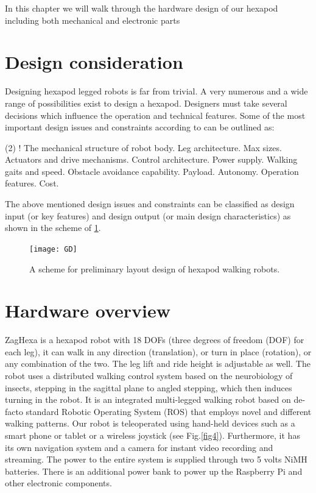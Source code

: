 In this chapter we will walk through the hardware design of our hexapod including both mechanical and electronic parts

\section{Design consideration}
Designing hexapod legged robots is far from trivial. A very numerous and a wide range of possibilities exist to design a hexapod. Designers must take several decisions which influence the operation and technical features. Some of the most important design issues and constraints according to \cite{48h} can be outlined as:

\begin{tasks}[style=itemize,after-item-skip = {-1ex}](2)
	\task! The mechanical structure of robot body.
	\task Leg architecture.
	\task Max sizes.
	\task Actuators and drive mechanisms.
	\task Control architecture.
	\task Power supply.
	\task Walking gaits and speed.
	\task Obstacle avoidance capability.
	\task Payload.
	\task Autonomy.
	\task Operation features.
	\task Cost.
\end{tasks}

The above mentioned design issues and constraints can be classified as design input (or key	features) and design output (or main design characteristics) as shown in the scheme of \ref{GD}.

\begin{figure}[H]		
	\centering
	\texttt{[image: GD]}
    \caption{ A scheme for preliminary layout design of hexapod walking robots.}
	\label{GD}
\end{figure}

\section{Hardware overview}
ZagHexa is a hexapod robot with 18 DOFs (three degrees of freedom (DOF) for each leg), it can walk in any direction (translation), or turn in place (rotation), or any combination of the two. The leg lift and ride height is adjustable as well. The robot uses a distributed walking control system based on the neurobiology of insects, stepping in the sagittal plane to angled stepping, which then induces turning in the robot.
It is an integrated multi-legged walking robot based on de-facto standard Robotic Operating System (ROS) that employs novel and different walking patterns.
Our robot is teleoperated using hand-held devices such as a smart phone or tablet or a wireless joystick (see Fig.\ref{fig4}). Furthermore, it has its own navigation system and a camera for instant video recording and streaming.
The power to the entire system is supplied through two 5 volts NiMH batteries. There is an additional power bank to power up the Raspberry Pi and other electronic components. 

